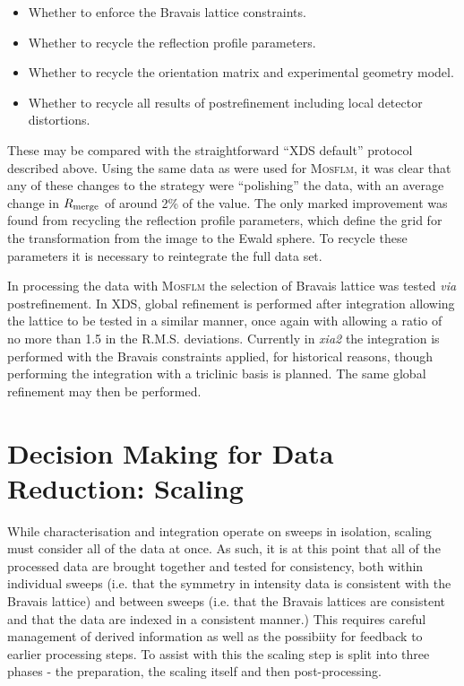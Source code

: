 \documentclass[preprint,pdf]{iucr}
\begin{document}
\begin{itemize}
\item{Whether to enforce the Bravais lattice constraints.}
\item{Whether to recycle the reflection profile parameters.}
\item{Whether to recycle the orientation matrix and experimental
    geometry model.}
\item{Whether to recycle all results of postrefinement including local
    detector distortions.}
\end{itemize}

\noindent
These may be compared with the straightforward ``XDS default''
protocol described above. Using
the same data as were used for \textsc{Mosflm}, it was
clear that any of these changes to the strategy were ``polishing'' the
data, with an average change in $R_{\rm{merge}}$ of around 2\% of the
value. The only marked improvement was found from recycling the
reflection profile parameters, which define the grid for the
transformation from the image to the Ewald sphere.
To recycle these parameters it is necessary to reintegrate the full data set.

In processing the data with \textsc{Mosflm} the selection of Bravais lattice
was tested \emph{via} postrefinement. In XDS, global refinement is
performed after integration allowing the lattice to be tested in a
similar manner, once again with allowing a ratio of no more than 1.5
in the R.M.S. deviations. Currently in
\emph{xia2} the integration is performed with the Bravais constraints
applied, for historical reasons, though performing the integration
with a triclinic basis is planned. The same global refinement may then
be performed.

\section{Decision Making for Data Reduction: Scaling}

While characterisation and integration operate on sweeps in isolation,
scaling must consider all of the data at once. As such, it is at this
point that all of the processed data are brought together and tested
for consistency, both within individual sweeps (i.e. that the symmetry
in intensity data is consistent with the Bravais lattice) and between
sweeps (i.e. that the Bravais lattices are consistent and that the
data are indexed in a consistent manner.) This requires careful
management of derived information as well as the possibiity for feedback to
earlier processing steps. To assist with this the scaling step is
split into three phases - the preparation, the scaling itself and then
post-processing.
\end{document}
